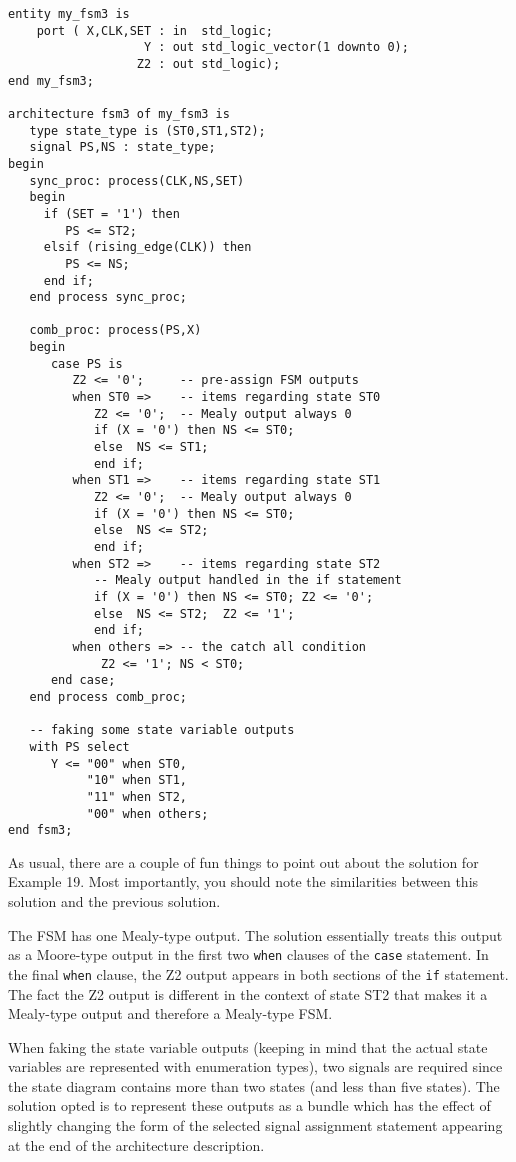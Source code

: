 \begin{lstlisting}[label=exe_19_code, caption=Solution to Example 19.]
entity my_fsm3 is 
    port ( X,CLK,SET : in  std_logic; 
                   Y : out std_logic_vector(1 downto 0); 
                  Z2 : out std_logic); 
end my_fsm3;

architecture fsm3 of my_fsm3 is
   type state_type is (ST0,ST1,ST2); 
   signal PS,NS : state_type; 
begin
   sync_proc: process(CLK,NS,SET)
   begin
     if (SET = '1') then 
        PS <= ST2; 
     elsif (rising_edge(CLK)) then 
        PS <= NS; 
     end if; 
   end process sync_proc; 

   comb_proc: process(PS,X)
   begin
      case PS is 
         Z2 <= '0';     -- pre-assign FSM outputs
         when ST0 =>    -- items regarding state ST0
            Z2 <= '0';  -- Mealy output always 0
            if (X = '0') then NS <= ST0;  
            else  NS <= ST1; 
            end if; 
         when ST1 =>    -- items regarding state ST1
            Z2 <= '0';  -- Mealy output always 0
            if (X = '0') then NS <= ST0; 
            else  NS <= ST2; 
            end if; 
         when ST2 =>    -- items regarding state ST2
            -- Mealy output handled in the if statement
            if (X = '0') then NS <= ST0; Z2 <= '0'; 
            else  NS <= ST2;  Z2 <= '1';     
            end if; 
         when others => -- the catch all condition
             Z2 <= '1'; NS < ST0; 
      end case; 
   end process comb_proc; 
 
   -- faking some state variable outputs
   with PS select
      Y <= "00" when ST0, 
           "10" when ST1, 
           "11" when ST2, 
           "00" when others; 
end fsm3;
\end{lstlisting}

As usual, there are a couple of fun things to point out about the solution for Example 19. Most importantly, you should note the similarities between this solution and the previous solution. 


\begin{my_list}
\item The FSM has one Mealy-type output. The solution essentially treats this output as a Moore-type output in the first two \texttt{when} clauses of the \texttt{case} statement. In the final \texttt{when} clause, the Z2 output appears in both sections of the \texttt{if} statement. The fact the Z2 output is different in the context of state ST2 that makes it a Mealy-type output and therefore a Mealy-type FSM. 

\item When faking the state variable outputs (keeping in mind that the actual state variables are represented with enumeration types), two signals are required since the state diagram contains more than two states (and less than five states). The solution opted is to represent these outputs as a bundle which has the effect of slightly changing the form of the selected signal assignment statement appearing at the end of the architecture description. 
\end{my_list}

